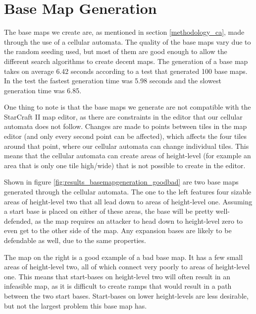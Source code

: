 \section{Base Map Generation}
\label{results_basemapgeneration}

The base maps we create are, as mentioned in section \ref{methodology_ca}, made through the use of a cellular automata. The quality of the base maps vary due to the random seeding used, but most of them are good enough to allow the different search algorithms to create decent maps. The generation of a base map takes on average 6.42 seconds according to a test that generated 100 base maps. In the test the fastest generation time was 5.98 seconds and the slowest generation time was 6.85.

One thing to note is that the base maps we generate are not compatible with the StarCraft II map editor, as there are constraints in the editor that our cellular automata does not follow. Changes are made to points between tiles in the map editor (and only every second point can be affected), which affects the four tiles around that point, where our cellular automata can change individual tiles. This means that the cellular automata can create areas of height-level (for example an area that is only one tile high/wide) that is not possible to create in the editor.


Shown in figure \ref{fig:results_basemapgeneration_goodbad} are two base maps generated through the cellular automata. The one to the left features four sizable areas of height-level two that all lead down to areas of height-level one. Assuming a start base is placed on either of these areas, the base will be pretty well-defended, as the map requires an attacker to head down to height-level zero to even get to the other side of the map. Any expansion bases are likely to be defendable as well, due to the same properties.

The map on the right is a good example of a bad base map. It has a few small areas of height-level two, all of which connect very poorly to areas of height-level one. This means that start-bases on height-level two will often result in an infeasible map, as it is difficult to create ramps that would result in a path between the two start bases. Start-bases on lower height-levels are less desirable, but not the largest problem this base map has. 

